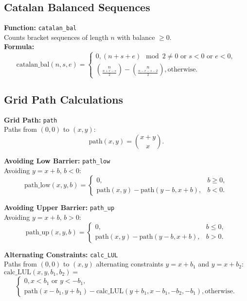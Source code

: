     \subsection{Catalan Balanced Sequences}
    \textbf{Function:} \texttt{catalan\_bal} \\
    Counts bracket sequences of length $n$ with balance $\geq 0$. \\
    \textbf{Formula:}
    \[
    \text{catalan\_bal}(n, s, e) =
    \begin{cases}
    0, (n+s+e)\!\mod\!2 \neq 0 \text{ or } s<0 \text{ or } e<0, \\
    \binom{n}{\frac{n+e-s}{2}} - \binom{n}{\frac{n-e-s-2}{2}}, \text{otherwise}.
    \end{cases}
    \]

    \subsection{Grid Path Calculations}
    \textbf{Grid Path:} \texttt{path} \\
    Paths from $(0, 0)$ to $(x, y)$:
    \[
    \text{path}(x, y) = \binom{x+y}{x}.
    \]

    \textbf{Avoiding Low Barrier:} \texttt{path\_low} \\
    Avoiding $y=x+b$, $b<0$:
    \[
    \text{path\_low}(x, y, b) = 
    \begin{cases}
    0, & b\geq 0, \\
    \text{path}(x, y) - \text{path}(y-b, x+b), & b<0.
    \end{cases}
    \]

    \textbf{Avoiding Upper Barrier:} \texttt{path\_up} \\
    Avoiding $y=x+b$, $b>0$:
    \[
    \text{path\_up}(x, y, b) =
    \begin{cases}
    0, & b\leq 0, \\
    \text{path}(x, y) - \text{path}(y-b, x+b), & b>0.
    \end{cases}
    \]

    \textbf{Alternating Constraints:} \texttt{calc\_LUL} \\
    Paths from $(0, 0)$ to $(x, y)$ alternating constraints $y=x+b_1$ and $y=x+b_2$: \newline
    $\text{calc\_LUL}(x, y, b_1, b_2) =$ \newline
	\[
    \begin{cases}
    0, x<b_1 \text{ or } y<-b_1, \\
    \text{path}(x-b_1, y+b_1) - \text{calc\_LUL}(y+b_1, x-b_1, -b_2, -b_1), \text{otherwise}.
    \end{cases}
    \]

